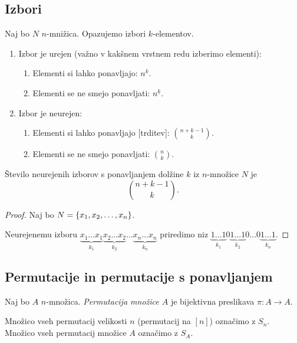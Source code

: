 \subsection{Izbori}
Naj bo $N$ $n$-mnižica. Opazujemo izbori $k$-elementov.
\begin{enumerate}
    \item Izbor je urejen (važno v kakšnem vrstnem redu izberimo elementi):
    \begin{enumerate}
        \item Elementi si lahko ponavljajo: $n^k$.
        \item Elementi se ne smejo ponavljati: $n^{\underline{k}}$.
    \end{enumerate}
    \item Izbor je neurejen:
    \begin{enumerate}
        \item Elementi si lahko ponavljajo [trditev]: $\binom{n+k-1}{k}$.
        \item Elementi se ne smejo ponavljati: $\binom{n}{k}$.
    \end{enumerate}
\end{enumerate}

\begin{trditev}
    Število neurejenih izborov s ponavljanjem dolžine $k$ iz $n$-množice $N$ je 
    $$\binom{n+k-1}{k}.$$
\end{trditev}

\begin{proof}
    Naj bo $N = \left\{x_1, x_2, \ldots, x_n\right\}$. 
    
    Neurejenemu izboru $\underbrace{x_1\ldots x_1}_{k_1} \underbrace{x_2 \ldots x_2}_{k_2} \ldots \underbrace{x_n \ldots x_n}_{k_n}$ priredimo niz $\underbrace{1 \ldots 1}_{k_1} 0 \underbrace{1 \ldots 1}_{k_2} 0 \ldots 0 \underbrace{1 \ldots 1}_{k_n}$.
\end{proof}

\subsection{Permutacije in permutacije s ponavljanjem}
\begin{definicija}
    Naj bo $A$ $n$-množica. \emph{Permutacija množice $A$} je bijektivna preslikava $\pi: A \to A$.

    Množico vseh permutacij velikosti $n$ (permutacij na $[n]$) označimo z $S_n$. 
    Množico vseh permutacij množice $A$ označimo z $S_A$.
\end{definicija}

